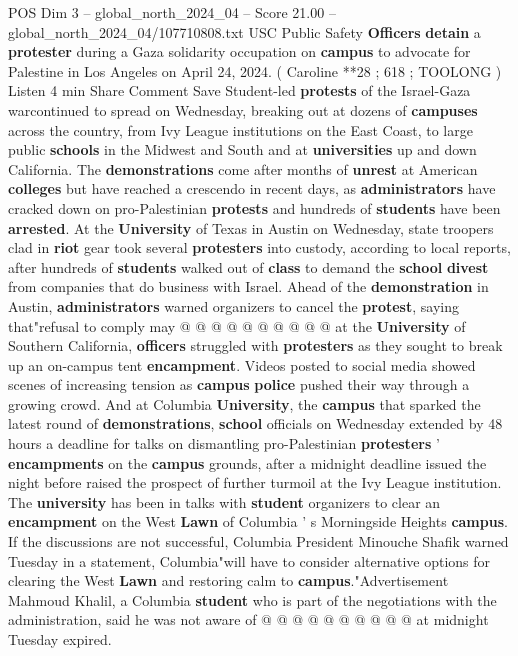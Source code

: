 \begin{textsample}{POS Dim 3 – global\_north\_2024\_04 – Score 21.00 – global\_north\_2024\_04/107710808.txt}  \label{ex:f3_pos_057}
USC Public Safety \textbf{Officers} \textbf{detain} a \textbf{protester} during a Gaza solidarity occupation on \textbf{campus} to advocate for Palestine in Los Angeles on April 24, 2024. ( Caroline **28 ; 618 ; TOOLONG ) Listen 4 min Share Comment Save Student-led \textbf{protests} of the Israel-Gaza warcontinued to spread on Wednesday, breaking out at dozens of \textbf{campuses} across the country, from Ivy League institutions on the East Coast, to large public \textbf{schools} in the Midwest and South and at \textbf{universities} up and down California.
The \textbf{demonstrations} come after months of \textbf{unrest} at American \textbf{colleges} but have reached a crescendo in recent days, as \textbf{administrators} have cracked down on pro-Palestinian \textbf{protests} and hundreds of \textbf{students} have been \textbf{arrested}.
At the \textbf{University} of Texas in Austin on Wednesday, state troopers clad in \textbf{riot} gear took several \textbf{protesters} into custody, according to local reports, after hundreds of \textbf{students} walked out of \textbf{class} to demand the \textbf{school} \textbf{divest} from companies that do business with Israel.
Ahead of the \textbf{demonstration} in Austin, \textbf{administrators} warned organizers to cancel the \textbf{protest}, saying that"refusal to comply may @ @ @ @ @ @ @ @ @ @ at the \textbf{University} of Southern California, \textbf{officers} struggled with \textbf{protesters} as they sought to break up an on-campus tent \textbf{encampment}.
Videos posted to social media showed scenes of increasing tension as \textbf{campus} \textbf{police} pushed their way through a growing crowd.
And at Columbia \textbf{University}, the \textbf{campus} that sparked the latest round of \textbf{demonstrations}, \textbf{school} officials on Wednesday extended by 48 hours a deadline for talks on dismantling pro-Palestinian \textbf{protesters} ' \textbf{encampments} on the \textbf{campus} grounds, after a midnight deadline issued the night before raised the prospect of further turmoil at the Ivy League institution.
The \textbf{university} has been in talks with \textbf{student} organizers to clear an \textbf{encampment} on the West \textbf{Lawn} of Columbia ' s Morningside Heights \textbf{campus}.
If the discussions are not successful, Columbia President Minouche Shafik warned Tuesday in a statement, Columbia"will have to consider alternative options for clearing the West \textbf{Lawn} and restoring calm to \textbf{campus}."Advertisement Mahmoud Khalil, a Columbia \textbf{student} who is part of the negotiations with the administration, said he was not aware of @ @ @ @ @ @ @ @ @ @ at midnight Tuesday expired.

\end{textsample}
